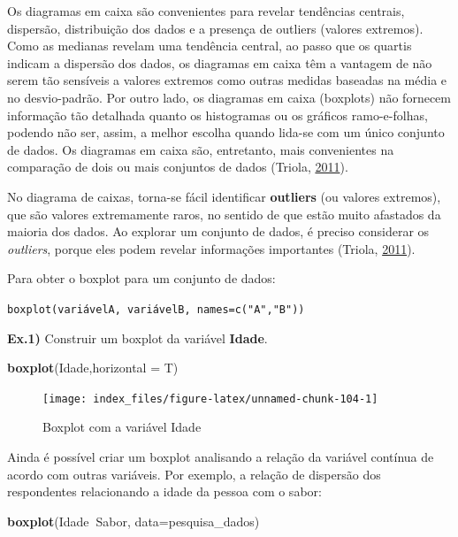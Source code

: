 \documentclass[12pt,brazil,oneside]{book}
\newenvironment{Shaded}{\begin{snugshade}}{\end{snugshade}}
\newcommand{\DataTypeTok}[1]{\textcolor[rgb]{0.13,0.29,0.53}{#1}}
\newcommand{\KeywordTok}[1]{\textcolor[rgb]{0.13,0.29,0.53}{\textbf{#1}}}
\newcommand{\NormalTok}[1]{#1}
\newcommand{\OperatorTok}[1]{\textcolor[rgb]{0.81,0.36,0.00}{\textbf{#1}}}
\begin{document}
Os diagramas em caixa são convenientes para revelar tendências centrais, dispersão, distribuição dos dados e a presença de outliers (valores extremos). Como as medianas revelam uma tendência central, ao passo que os quartis indicam a dispersão dos dados, os diagramas em caixa têm a vantagem de não serem tão sensíveis a valores extremos como outras medidas baseadas na média e no desvio-padrão. Por outro lado, os diagramas em caixa (boxplots) não fornecem informação tão detalhada quanto os histogramas ou os gráficos ramo-e-folhas, podendo não ser, assim, a melhor escolha quando lida-se com um único conjunto de dados. Os diagramas em caixa são, entretanto, mais convenientes na comparação de dois ou mais conjuntos de dados (Triola, \protect\hyperlink{ref-triola1999}{2011}).

No diagrama de caixas, torna-se fácil identificar \textbf{outliers} (ou valores extremos), que são valores extremamente raros, no sentido de que estão muito afastados da maioria dos dados. Ao explorar um conjunto de dados, é preciso considerar os \emph{outliers}, porque eles podem revelar informações importantes (Triola, \protect\hyperlink{ref-triola1999}{2011}).

Para obter o boxplot para um conjunto de dados:

\texttt{boxplot(variávelA,\ variávelB,\ names=c("A","B"))}

\textbf{Ex.1)} Construir um boxplot da variável \textbf{Idade}.

\begin{Shaded}
\begin{Highlighting}[]
\KeywordTok{boxplot}\NormalTok{(Idade,}\DataTypeTok{horizontal =}\NormalTok{ T)}
\end{Highlighting}
\end{Shaded}

\begin{figure}[H]

{\centering \texttt{[image: index\_files/figure-latex/unnamed-chunk-104-1]} 

}

\caption{Boxplot com a variável Idade}\label{fig:unnamed-chunk-104}
\end{figure}

Ainda é possível criar um boxplot analisando a relação da variável contínua de acordo com outras variáveis. Por exemplo, a relação de dispersão dos respondentes relacionando a idade da pessoa com o sabor:

\begin{Shaded}
\begin{Highlighting}[]
\KeywordTok{boxplot}\NormalTok{(Idade}\OperatorTok{~}\NormalTok{Sabor, }\DataTypeTok{data=}\NormalTok{pesquisa_dados)}
\end{Highlighting}
\end{Shaded}
\end{document}

